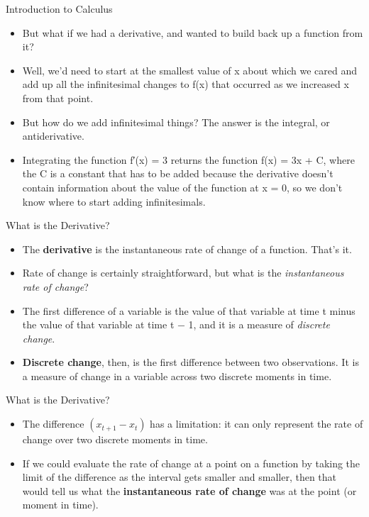\documentclass[
  ignorenonframetext,
]{beamer}
\begin{document}
\begin{frame}{Introduction to Calculus}
\protect\hypertarget{introduction-to-calculus-1}{}

\begin{itemize}
\item
  But what if we had a derivative, and wanted to build back up a
  function from it?
\item
  Well, we'd need to start at the smallest value of x about which we
  cared and add up all the infinitesimal changes to f(x) that occurred
  as we increased x from that point.
\item
  But how do we add infinitesimal things? The answer is the integral, or
  antiderivative.
\item
  Integrating the function f′(x) = 3 returns the function f(x) = 3x + C,
  where the C is a constant that has to be added because the derivative
  doesn't contain information about the value of the function at x = 0,
  so we don't know where to start adding infinitesimals.
\end{itemize}

\end{frame}

\begin{frame}{What is the Derivative?}
\protect\hypertarget{what-is-the-derivative}{}

\begin{itemize}
\item
  The \textbf{derivative} is the instantaneous rate of change of a
  function. That's it.
\item
  Rate of change is certainly straightforward, but what is the
  \emph{instantaneous rate of change}?
\item
  The first difference of a variable is the value of that variable at
  time t minus the value of that variable at time t − 1, and it is a
  measure of \emph{discrete change}.
\item
  \textbf{Discrete change}, then, is the first difference between two
  observations. It is a measure of change in a variable across two
  discrete moments in time.
\end{itemize}

\end{frame}

\begin{frame}{What is the Derivative?}
\protect\hypertarget{what-is-the-derivative-1}{}

\begin{itemize}
\item
  The difference \((x_{t+1} − x_{t})\) has a limitation: it can only
  represent the rate of change over two discrete moments in time.
\item
  If we could evaluate the rate of change at a point on a function by
  taking the limit of the difference as the interval gets smaller and
  smaller, then that would tell us what the \textbf{instantaneous rate
  of change} was at the point (or moment in time).
\end{itemize}

\end{frame}
\end{document}
